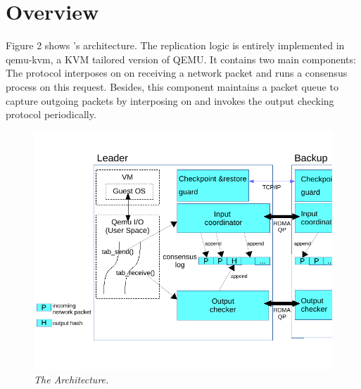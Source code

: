 \section{\xxx Overview} \label{sec:overview}

Figure 2 shows \xxx's architecture. The replication logic is entirely 
implemented in qemu-kvm, a KVM tailored version of QEMU. It contains 
two main components: 
The protocol interposes on \tapsend on receiving a network packet and runs 
a consensus process on this request. Besides, this component maintains a 
packet queue to capture outgoing packets by interposing on \taprecv and invokes 
the output checking protocol periodically.


\begin{figure}[t]
\centering
\includegraphics[width=.47\textwidth]{figures/arch}
\vspace{-.2in}
\caption{{\em The \xxx Architecture.}} \label{fig:arc}
\vspace{.05in}
\end{figure}
